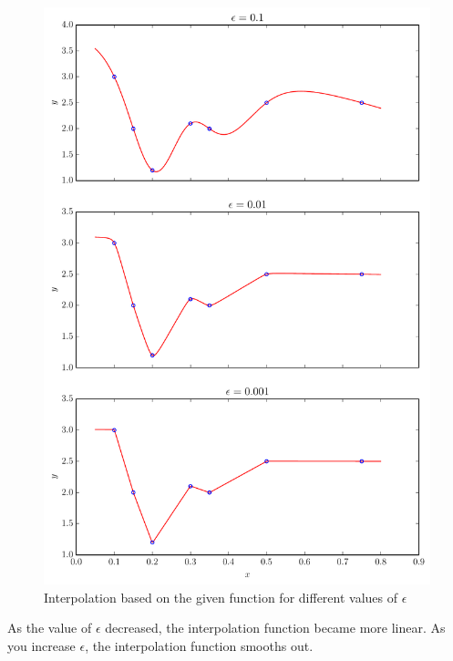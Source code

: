 \documentclass[12pt]{article}
\begin{document}
\begin{enumerate}
\begin{enumerate}
\begin{figure}[H]
\centering
\includegraphics[width=.75\textwidth]{int_plot.pdf}
\caption{Interpolation based on the given function for different values of $\epsilon$}
\end{figure}

As the value of $\epsilon$ decreased, the interpolation function became more linear. As you increase $\epsilon$, the interpolation function smooths out.


\end{enumerate}

\end{enumerate}

\end{document}
